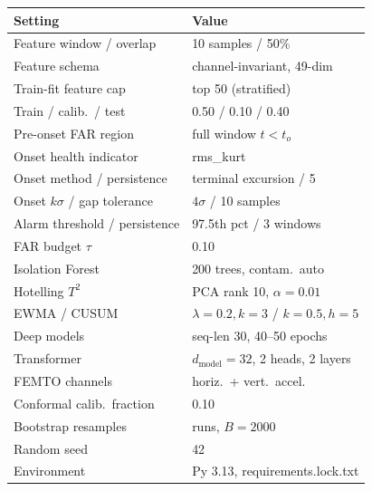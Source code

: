 	\begin{tabular}{l l}
		\hline \hline
		\textbf{Setting} & \textbf{Value} \\
		\hline
		Feature window / overlap & 10 samples / 50\% \\
		Feature schema & channel-invariant, 49-dim \\
		Train-fit feature cap & top 50 (stratified) \\
		Train / calib.\ / test & 0.50 / 0.10 / 0.40 \\
		Pre-onset FAR region & full window $t < t_o$ \\
		Onset health indicator & rms\_kurt \\
		Onset method / persistence & terminal excursion / 5 \\
		Onset $k\sigma$ / gap tolerance & $4\sigma$ / 10 samples \\
		Alarm threshold / persistence & 97.5th pct / 3 windows \\
		FAR budget $\tau$ & 0.10 \\
		Isolation Forest & 200 trees, contam.\ auto \\
		Hotelling $T^2$ & PCA rank 10, $\alpha=0.01$ \\
		EWMA / CUSUM & $\lambda{=}0.2, k{=}3$ / $k{=}0.5, h{=}5$ \\
		Deep models & seq-len 30, 40--50 epochs \\
		Transformer & $d_{\text{model}}{=}32$, 2 heads, 2 layers \\
		FEMTO channels & horiz.\ + vert.\ accel. \\
		Conformal calib.\ fraction & 0.10 \\
		Bootstrap resamples & runs, $B{=}2000$ \\
		Random seed & 42 \\
		Environment & Py 3.13, requirements.lock.txt \\
		\hline \hline
	\end{tabular}
